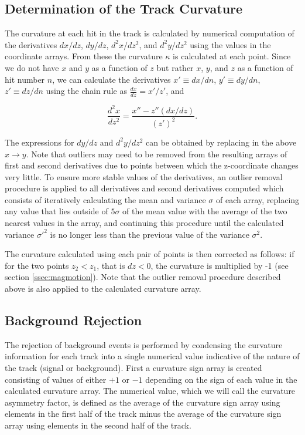 \documentclass{JINST}
\begin{document}
\subsection{Determination of the Track Curvature}\label{ssec:curvature}
The curvature at each hit in the track is calculated by numerical computation of the derivatives $dx/dz$, $dy/dz$, $d^2x/dz^2$, and $d^2y/dz^2$ using the values in the coordinate arrays.  From these the curvature $\kappa$ is calculated at each point.  Since we do not have $x$ and $y$ as a function of $z$ but rather $x$, $y$, and $z$ as a function of hit number $n$, we can calculate the derivatives $x' \equiv dx/dn$, $y' \equiv dy/dn$, $z' \equiv dz/dn$ using the chain rule as $\frac{dx}{dz} = x'/z'$, and

\begin{equation}
\frac{d^2x}{dz^2} = \frac{x'' - z''(dx/dz)}{(z')^2}.
\end{equation}

The expressions for $dy/dz$ and $d^2y/dz^2$ can be obtained by replacing in the above $x \rightarrow y$.  Note that outliers may need to be removed from the resulting arrays of first and second derivatives due to points between which the z-coordinate changes very little.  To ensure more stable values of the derivatives, an outlier removal procedure is applied to all derivatives and second derivatives computed which consists of iteratively calculating the mean and variance $\sigma$ of each array, replacing any value that lies outside of $5\sigma$ of the mean value with the average of the two nearest values in the array, and continuing this procedure until the calculated variance $\sigma'^2$ is no longer less than the previous value of the variance $\sigma^2$. %

The curvature calculated using each pair of points is then corrected as follows: if for the two points $z_2 < z_1$, that is 
$dz < 0$, the curvature is multiplied by -1 (see section \ref{ssec:magmotion}).  Note that the outlier removal procedure 
described above is also applied to the calculated curvature array.  

\subsection{Background Rejection}
The rejection of background events is performed by condensing the curvature information for each track into a single
numerical value indicative of the nature of the track (signal or background).  First a curvature sign array is created 
consisting of values of either $+1$ or $-1$ depending on the sign of each value in the calculated curvature array.  The 
numerical value, which we will
call the curvature asymmetry factor, is defined as the average of the curvature sign array using elements in the first half of 
the track minus the average of the curvature sign array using elements in the second half of the track.  
\end{document}
